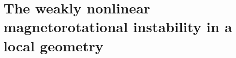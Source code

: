 \chapter[The weakly nonlinear magnetorotational instability in a local geometry]{The weakly nonlinear magnetorotational instability in a local geometry\label{ch:mri_local}}
\let\thefootnote\relax{}